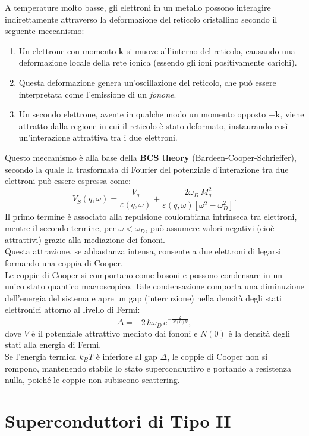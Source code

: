 A temperature molto basse, gli elettroni in un metallo possono interagire indirettamente attraverso la deformazione del reticolo cristallino secondo il seguente meccanismo:
\begin{enumerate}
    \item Un elettrone con momento \(\mathbf{k}\) si muove all'interno del reticolo, causando una deformazione locale della rete ionica (essendo gli ioni positivamente carichi).
    \item Questa deformazione genera un'oscillazione del reticolo, che può essere interpretata come l'emissione di un \emph{fonone}.
    \item Un secondo elettrone, avente in qualche modo un momento opposto \(-\mathbf{k}\), viene attratto dalla regione in cui il reticolo è stato deformato, instaurando così un'interazione attrattiva tra i due elettroni. 
\end{enumerate}
Questo meccanismo è alla base della \textbf{BCS theory} (Bardeen-Cooper-Schrieffer), secondo la quale la trasformata di Fourier del potenziale d'interazione tra due elettroni può essere espressa come:
\[
V_S(q,\omega) = \frac{V_q}{\varepsilon(q,\omega)} + \frac{2\omega_D\, M_q^2}{\varepsilon(q,\omega) \left[\omega^2 - \omega_D^2\right]}.
\]
Il primo termine è associato alla repulsione coulombiana intrinseca tra elettroni, mentre il secondo termine, per \(\omega < \omega_D\), può assumere valori negativi (cioè attrattivi) grazie alla mediazione dei fononi. \\
Questa attrazione, se abbastanza intensa, consente a due elettroni di legarsi formando una coppia di Cooper. \\
Le coppie di Cooper si comportano come bosoni e possono condensare in un unico stato quantico macroscopico. Tale condensazione comporta una diminuzione dell'energia del sistema e apre un gap (interruzione) nella densità degli stati elettronici attorno al livello di Fermi:
\[
\Delta = -2\,\hbar\omega_D\, e^{-\frac{2}{N(0)V}},
\]
dove \(V\) è il potenziale attrattivo mediato dai fononi e \(N(0)\) è la densità degli stati alla energia di Fermi. \\
Se l'energia termica \(k_B T\) è inferiore al gap \(\Delta\), le coppie di Cooper non si rompono, mantenendo stabile lo stato superconduttivo e portando a resistenza nulla, poiché le coppie non subiscono scattering.
\section{Superconduttori di Tipo II}

